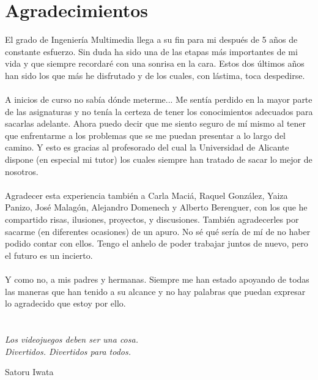 
\cleardoublepage %
\chapter*{Agradecimientos}

\thispagestyle{empty}
\vspace{1cm}

El grado de Ingeniería Multimedia llega a su fin para mi después de 5 años de constante esfuerzo. Sin duda ha sido una de las etapas más importantes de mi vida y que siempre recordaré con una sonrisa en la cara. Estos dos últimos años han sido los que más he disfrutado y de los cuales, con lástima, toca despedirse.
\\ \\
A inicios de curso no sabía dónde meterme... Me sentía perdido en la mayor parte de las asignaturas y no tenía la certeza de tener los conocimientos adecuados para sacarlas adelante. Ahora puedo decir que me siento seguro de mí mismo al tener que enfrentarme a los problemas que se me puedan presentar a lo largo del camino. Y esto es gracias al profesorado del cual la Universidad de Alicante dispone (en especial mi tutor) los cuales siempre han tratado de sacar lo mejor de nosotros.
\\ \\
Agradecer esta experiencia también a Carla Maciá, Raquel González, Yaiza Panizo, José Malagón, Alejandro Domenech y Alberto Berenguer, con los que he compartido risas, ilusiones, proyectos, y discusiones. También agradecerles por sacarme (en diferentes ocasiones) de un apuro. No sé qué sería de mí de no haber podido contar con ellos. Tengo el anhelo de poder trabajar juntos de nuevo, pero el futuro es un incierto.
\\ \\
Y como no, a mis padres y hermanas. Siempre me han estado apoyando de todas las maneras que han tenido a su alcance y no hay palabras que puedan expresar lo agradecido que estoy por ello.

\cleardoublepage %
\chapter*{}
\thispagestyle{empty}
\setlength{\leftmargin}{0.5\textwidth}
\setlength{\parsep}{0cm}
\addtolength{\topsep}{0.5cm}
\begin{flushright}
\em{
Los videojuegos deben ser una cosa.\\
Divertidos. Divertidos para todos.
}
\end{flushright}
\begin{flushright}
{
Satoru Iwata
}
\end{flushright}
\cleardoublepage %
